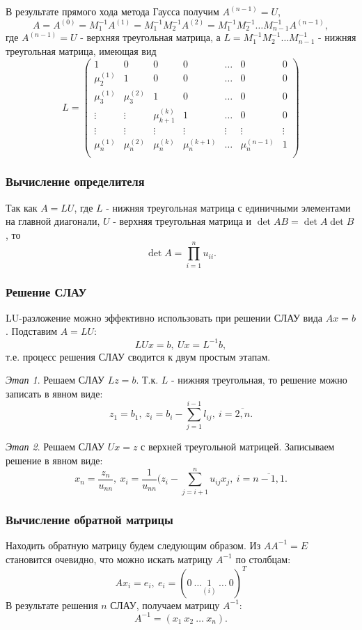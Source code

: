 \documentclass[a4paper,12pt]{article}
\begin{document}
В результате прямого хода метода Гаусса получим $A^{(n - 1)} = U$,
$$
A = A^{(0)} = M_1^{-1} A^{(1)} = M_1^{-1} M_2^{-1} A^{(2)}
= M_1^{-1} M_2^{-1} \ldots M_{n - 1}^{-1}A^{(n - 1)},
$$
где $A^{(n - 1)} = U$ - верхняя треугольная матрица, а
$L = M_1^{-1} M_2^{-1} \ldots M_{n - 1}^{-1}$ - нижняя треугольная
матрица, имеющая вид
$$
L =
\begin{pmatrix}
    1 & 0 & 0 & 0 & \ldots & 0 & 0\\
    \mu_{2}^{(1)} & 1 & 0 & 0 & \ldots & 0 & 0\\
    \mu_{3}^{(1)} & \mu_{3}^{(2)} & 1 & 0 & \ldots & 0 & 0\\
    \vdots & \vdots & \mu_{k+1}^{(k)} & 1 & \ldots & 0 & 0 \\
    \vdots & \vdots & \vdots & \vdots & \vdots & \vdots & \vdots \\
    \mu_{n}^{(1)} & \mu_{n}^{(2)}  & \mu_{n}^{(k)} &
            \mu_{n}^{(k + 1)} & \ldots &  \mu_{n}^{(n - 1)} & 1\\
\end{pmatrix}
$$

\subsubsection{Вычисление определителя}
Так как $A = LU$, где $L$ - нижняя треугольная матрица
с единичными элементами на главной диагонали,
$U$ - верхняя треугольная матрица и $\det{AB} =\det{A}\det{B}$, то
$$
\det{A} = \prod_{i = 1}^{n} u_{ii}.
$$

\subsubsection{Решение СЛАУ}
LU-разложение можно эффективно использовать при решении
СЛАУ вида $Ax = b$. Подставим $A = LU$:
$$
LUx = b,\ Ux = L^{-1}b,
$$
т.е. процесс решения СЛАУ сводится к двум простым этапам.

\textit{Этап 1}. Решаем СЛАУ $Lz = b$. Т.к. $L$ - нижняя треугольная,
то решение можно записать в явном виде:
$$
z_1 = b_1,\ z_i = b_i - \sum_{j = 1}^{i - 1}l_{ij},\ i = \overline{2, n}.
$$

\textit{Этап 2}. Решаем СЛАУ $Ux = z$ с верхней треугольной
матрицей. Записываем решение в явном виде:
$$
x_n = \frac{z_n}{u_{nn}},\ x_i = \frac{1}{u_{nn}}(z_i -
    \sum_{j = i + 1}^{n} u_{ij} x_j,\ i = \overline{n - 1, 1}.
$$

\subsubsection{Вычисление обратной матрицы}
Находить обратную матрицу будем следующим образом.
Из $AA^{-1} = E$ становится очевидно, что можно искать
матрицу $A^{-1}$ по столбцам:
$$
A x_i = e_i,\ e_i = (0\ \ldots \underset{(i)}{1}\ \ldots\ 0)^{T}
$$
В результате решения $n$ СЛАУ, получаем матрицу $A^{-1}$:
$$
A^{-1} = (x_1\ x_2\ \ldots\ x_n).
$$
\end{document}
